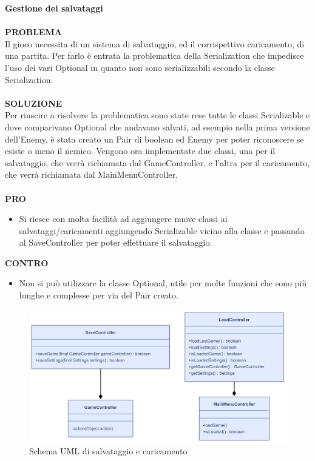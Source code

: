 \documentclass[a4paper,12pt]{report}
\begin{document}
\textbf{Gestione dei salvataggi}
\\
\\
\textbf{PROBLEMA}
\\
Il gioco necessita di un sistema di salvataggio, ed il corrispettivo caricamento, di una partita. Per farlo è entrata la problematica 
della Serialization che impedisce l'uso dei vari Optional in quanto non sono serializzabili secondo la classe Serialization.
\\
\\
\textbf{SOLUZIONE}
\\
Per riuscire a risolvere la problematica sono state rese tutte le classi Serializable e dove comparivano Optional che andavano salvati, ad esempio 
nella prima versione dell'Enemy, è stata creato un Pair di boolean ed Enemy per poter riconoscere se esiste o meno il nemico.
Vengono ora implementate due classi, una per il salvataggio, che verrà richiamata dal GameController, e l'altra per il caricamento, che verrà richiamata dal MainMenuController.
\\
\\
\textbf{PRO}
\begin{itemize}
	\item Si riesce con molta facilità ad aggiungere nuove classi ai salvataggi/caricamenti aggiungendo Serializable vicino 
	alla classe e passando al SaveController per poter effettuare il salvataggio.
\end{itemize}
\textbf{CONTRO}
\begin{itemize}
	\item Non si può utilizzare la classe Optional, utile per molte funzioni che sono più lunghe e complesse per via del Pair creato.
\end{itemize}
\begin{figure}[H]
	\centering{}
	\includegraphics[width=\textwidth]{img/Saving.png}
	\caption{Schema UML di salvataggio e caricamento}
	\label{img:saving}
\end{figure}
\newpage
\end{document}
